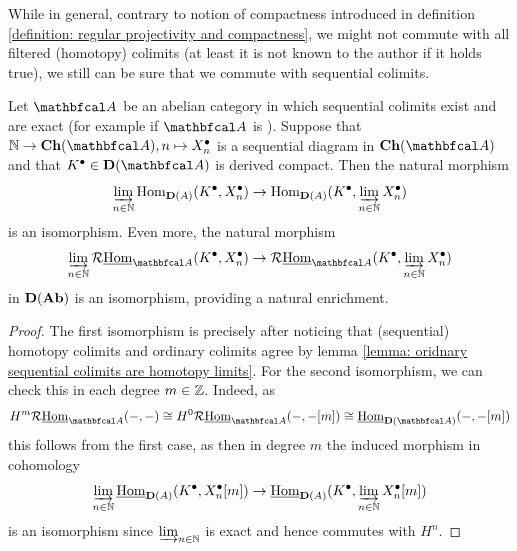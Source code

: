 While in general, contrary to notion of compactness introduced in definition \ref{definition: regular projectivity and compactness}, we might not commute with all filtered (homotopy) colimits (at least it is not known to the author if it holds true), we still can be sure that we commute with sequential colimits.
\begin{lemma}
	\label{lemma: commutation with sequential colimits}
	
	Let $\category{A}$ be an abelian category in which sequential colimits exist and are exact (for example if $\category{A}$ is ). Suppose that $\N \to \complexes{\category{A}}, n\mapsto X_n^\bullet$ is a sequential diagram in $\complexes{\category{A}}$ and that $K^\bullet \in \derived{\category{A}}$ is derived compact. Then the natural morphism
	$$\varinjlim_{n\in {\mathbb{N}}} {\operatorname{Hom}}_{{\mathbf{D}}(A)}(K^\bullet, X_n^\bullet) \to {\operatorname{Hom}}_{{\mathbf{D}}(A)}(K^\bullet, \varinjlim_{n\in {\mathbb{N}}} X_n^\bullet)$$
	is an isomorphism. Even more, the natural morphism
	$$\colimit_{n\in \N} \eRHom_\category{A}(K^\bullet, X_n^\bullet) \to \eRHom_\category{A}(K^\bullet, \colimit_{n\in \N} X_n^\bullet)$$
	in ${{\mathbf{D}}({{\mathbf{Ab}}})}$ is an isomorphism, providing a natural enrichment.
\end{lemma}
\begin{proof}
	The first isomorphism is precisely \cite[\href{https://stacks.math.columbia.edu/tag/094A}{Tag 094A}]{stacks-project} after noticing that (sequential) homotopy colimits and ordinary colimits agree by lemma \ref{lemma: oridnary sequential colimits are homotopy limits}. For the second isomorphism, we can check this in each degree $m\in {\mathbb{Z}}$. Indeed, as 
	$$H^m \eRHom_\category{A}(-, -)\cong H^0\eRHom_\category{A}(-, -[m]) \cong \eHom_\derived{\category{A}}(-, -[m])$$
	this follows from the first case, as then in degree $m$ the induced morphism in cohomology
	$$\varinjlim_{n\in {\mathbb{N}}} {\underline{\operatorname{Hom}}}_{{\mathbf{D}}(A)}(K^\bullet, X_n^\bullet[m])\to {\underline{\operatorname{Hom}}}_{{\mathbf{D}}(A)}(K^\bullet, \varinjlim_{n\in {\mathbb{N}}} X_n^\bullet[m])$$
	is an isomorphism since $\varinjlim_{n\in {\mathbb{N}}}$ is exact and hence commutes with $H^n$.
\end{proof}

